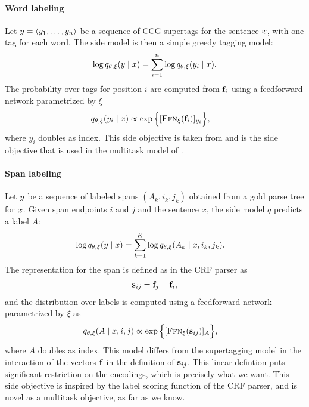   \paragraph{Word labeling}
    Let $y = \langle y_1, \dots, y_n \rangle$ be a sequence of CCG supertags for the sentence $x$, with one tag for each word. The side model is then a simple greedy tagging model:
    \begin{align*}
      \log q_{\theta, \xi}(y \mid x)
        &= \sum_{i=1}^n \log q_{\theta, \xi}( y_i \mid x).  \\
    \end{align*}
    The probability over tags for position $i$ are computed from $\mathbf{f}_i$ using a feedforward network parametrized by $\xi$
    \begin{align*}
      q_{\theta, \xi}( y_i \mid x) &\propto \exp \Big \{ [ \textsc{Ffn}_{\xi}( \mathbf{f}_{i} ) ]_{y_i} \Big\},
    \end{align*}
    where $y_i$ doubles as index. This side objective is taken from \citet{enguehard2017multitask} and is the side objective that is used in the multitask model of \citet{linzen2018targeted}.

  \paragraph{Span labeling}
    Let $y$ be a sequence of labeled spans $(A_k, i_k, j_k)$ obtained from a gold parse tree for $x$. Given span endpoints $i$ and $j$ and the sentence $x$, the side model $q$ predicts a label $A$:
    \begin{align*}
      \log q_{\theta, \xi}(y \mid x)
        &= \sum_{k=1}^K \log q_{\theta, \xi}( A_k \mid x, i_k, j_k).
    \end{align*}
    The representation for the span is defined as in the CRF parser as
    \begin{align*}
      \mathbf{s}_{ij} = \mathbf{f}_j - \mathbf{f}_i,
    \end{align*}
    and the distribution over labels is computed using a feedforward network parametrized by $\xi$ as
    \begin{align*}
      q_{\theta, \xi}( A \mid x, i, j) &\propto \exp \Big \{ [ \textsc{Ffn}_{\xi}( \mathbf{s}_{ij} ) ]_{A} \Big\},
    \end{align*}
    where $A$ doubles as index. This model differs from the supertagging model in the interaction of the vectors $\mathbf{f}$ in the definition of $\mathbf{s}_{ij}$. This linear defintion puts significant restriction on the encodings, which is precisely what we want. This side objective is inspired by the label scoring function of the CRF parser, and is novel as a multitask objective, as far as we know.


